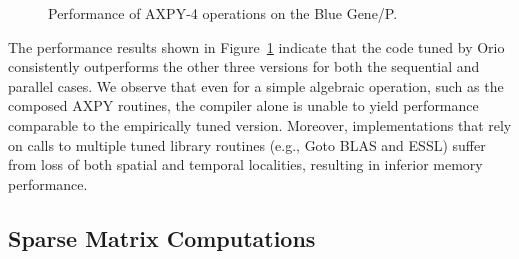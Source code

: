 \begin{figure}[thb] 
\begin{center} 
\end{center}
\vspace{-.2in} 
\caption{Performance of AXPY-4 operations on the Blue Gene/P.} 
\label{fig:axpy4-bgp-results} 
\end{figure} 

The performance results shown in Figure~\ref{fig:axpy4-bgp-results} indicate
that the code tuned by Orio consistently outperforms the other three versions
for both the sequential and parallel cases. We observe that even for a simple
algebraic operation, such as the composed AXPY routines, the compiler alone
is unable to yield performance comparable to the empirically tuned
version. Moreover, implementations that rely on calls to multiple tuned
library routines (e.g., Goto BLAS and ESSL) suffer from loss of both spatial
and temporal localities, resulting in inferior memory performance.

\subsection{Sparse Matrix Computations} 

